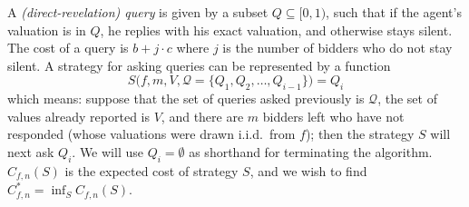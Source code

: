 \begin{definition}\label{def:query}
  A {\em (direct-revelation) query} is given by a subset $Q \subseteq
  [0,1)$, such that if the agent's valuation is in $Q$, he replies with his
  exact valuation, and otherwise stays silent.  The cost of a query is $b+j
  \cdot c$ where $j$ is the number of bidders who do not stay silent. 
A strategy for asking queries can be represented by a function
\begin{displaymath}
	S\big(f, m, V, \mathcal Q = \{Q_1, Q_2, \ldots, Q_{i-1} \}\big) = Q_i
\end{displaymath}
which means: 
suppose that the set of queries asked previously is
$\mathcal Q$, the set of values already reported is $V$, and there are $m$
bidders left who have not responded (whose valuations were drawn
i.i.d.~from $f$); then the strategy $S$ will next ask $Q_i$.
We will use $Q_i = \emptyset$ as shorthand for terminating the algorithm.
$C_{f,n}(S)$ is the expected cost of strategy $S$, and we wish to find
$C_{f,n}^* = \inf_S C_{f,n}(S)$.
\end{definition}

